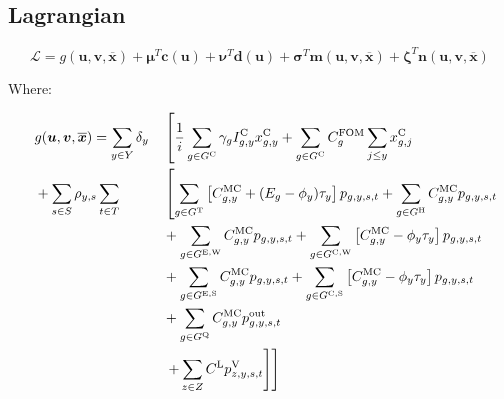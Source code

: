 \documentclass{article}
\begin{document}
\subsection{Lagrangian}

\begin{equation}
	\mathcal{L} = g(\bm{u}, \bm{v}, \overline{\bm{x}}) + \bm{\mu}^{T}\bm{c}(\bm{u}) + \bm{\nu}^{T}\bm{d}(\bm{u}) + \bm{\sigma}^{T}\bm{m}(\bm{u}, \bm{v}, \bm{\overline{x}}) + \bm{\zeta}^{T} \bm{n}(\bm{u}, \bm{v}, \bm{\overline{x}})
\end{equation}

Where:

\begin{alignat}{3}
	& && g(\bm{u}, \bm{v}, \overline{\bm{x}}) = \sum\limits_{\iYear \in \sYears} \cDiscountRate  &&  \left[\frac{1}{\cInterestRate} \sum\limits_{g\in \sGeneratorsCandidate} \cAmortisationRate  \cCandidateInvestmentCost \vInstalledCapacity + \sum\limits_{\iGenerator \in \sGeneratorsCandidate} \cFixedOperationsMaintenanceCostGenerator \sum\limits_{\iYearAlias \leq \iYear} \vInstalledCapacity[\iGenerator,\iYearAlias] 
	\right. \nonumber\\ 
	& && + \sum\limits_{\iScenario \in \sScenarios} \cScenarioDuration \sum\limits_{\iInterval \in \sIntervals} && \left[\sum\limits_{\iGenerator \in \sGeneratorsThermal} \left[\cMarginalCost + (\cEmissionsIntensity - \vBaseline)\vPermitPrice\right]\vPower  + \sum\limits_{\iGenerator \in \sGeneratorsHydro}\cMarginalCost \vPower \right. \nonumber\\
	& && && + \sum\limits_{\iGenerator \in \sGeneratorsExistingWind} \cMarginalCost \vPower + \sum\limits_{\iGenerator \in \sGeneratorsCandidateWind} \left[\cMarginalCost - \vBaseline \vPermitPrice\right] \vPower \nonumber\\
	& && && + \sum\limits_{\iGenerator \in \sGeneratorsExistingSolar} \cMarginalCost \vPower + \sum\limits_{\iGenerator \in \sGeneratorsCandidateSolar} \left[\cMarginalCost - \vBaseline\vPermitPrice\right] \vPower\nonumber\\
	& && && + \sum\limits_{\iGenerator \in \sStorage} \cMarginalCost \vPowerOut \nonumber\\
	& && && \left.\left. + \sum\limits_{\iZone \in \sZones} \cLostLoadCost \vLostLoadPower \right]\right] \nonumber\\

\end{alignat}
\end{document}
